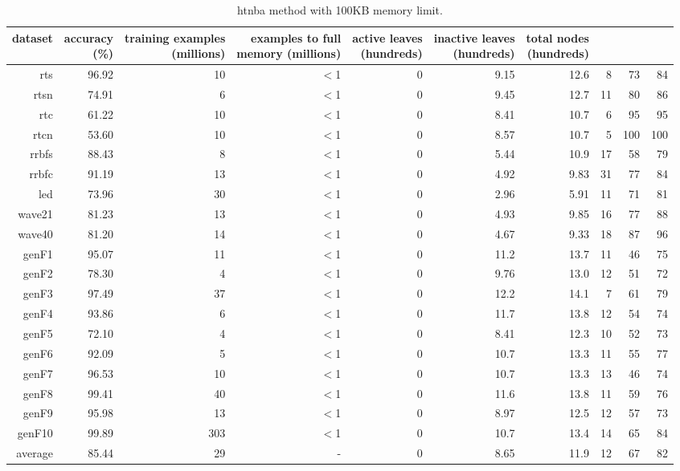 \clearpage
\begin{table}
\caption{{\sc htnba} method with 100KB memory limit.}
\label{tab:htnba-100k}
\centering
\begin{tabular}{|r|r|r|r|r|r|r|r|r|r|}
\hline
dataset	&
\rotatebox{90}{\parbox{9em}{accuracy\\(\%)}} &
\rotatebox{90}{\parbox{9em}{training examples\\(millions)}} &
\rotatebox{90}{\parbox{9em}{examples to full\\memory (millions)}} &
\rotatebox{90}{\parbox{9em}{active leaves\\(hundreds)}} &
\rotatebox{90}{\parbox{9em}{inactive leaves\\(hundreds)}} &
\rotatebox{90}{\parbox{9em}{total nodes\\(hundreds)}} &
\rotatebox{90}{\parbox{9em}{tree depth}}	&
\rotatebox{90}{\parbox{9em}{training speed (\%)}} &
\rotatebox{90}{\parbox{9em}{prediction speed (\%)}} \\
\hline
{\sc rts} & 96.92 & 10 & $<$1 & 0 & 9.15 & 12.6 & 8 & 73 & 84 \\
{\sc rtsn} & 74.91 & 6 & $<$1 & 0 & 9.45 & 12.7 & 11 & 80 & 86 \\
{\sc rtc} & 61.22 & 10 & $<$1 & 0 & 8.41 & 10.7 & 6 & 95 & 95 \\
{\sc rtcn} & 53.60 & 10 & $<$1 & 0 & 8.57 & 10.7 & 5 & 100 & 100 \\
{\sc rrbfs} & 88.43 & 8 & $<$1 & 0 & 5.44 & 10.9 & 17 & 58 & 79 \\
{\sc rrbfc} & 91.19 & 13 & $<$1 & 0 & 4.92 & 9.83 & 31 & 77 & 84 \\
{\sc led} & 73.96 & 30 & $<$1 & 0 & 2.96 & 5.91 & 11 & 71 & 81 \\
{\sc wave21} & 81.23 & 13 & $<$1 & 0 & 4.93 & 9.85 & 16 & 77 & 88 \\
{\sc wave40} & 81.20 & 14 & $<$1 & 0 & 4.67 & 9.33 & 18 & 87 & 96 \\
{\sc genF1} & 95.07 & 11 & $<$1 & 0 & 11.2 & 13.7 & 11 & 46 & 75 \\
{\sc genF2} & 78.30 & 4 & $<$1 & 0 & 9.76 & 13.0 & 12 & 51 & 72 \\
{\sc genF3} & 97.49 & 37 & $<$1 & 0 & 12.2 & 14.1 & 7 & 61 & 79 \\
{\sc genF4} & 93.86 & 6 & $<$1 & 0 & 11.7 & 13.8 & 12 & 54 & 74 \\
{\sc genF5} & 72.10 & 4 & $<$1 & 0 & 8.41 & 12.3 & 10 & 52 & 73 \\
{\sc genF6} & 92.09 & 5 & $<$1 & 0 & 10.7 & 13.3 & 11 & 55 & 77 \\
{\sc genF7} & 96.53 & 10 & $<$1 & 0 & 10.7 & 13.3 & 13 & 46 & 74 \\
{\sc genF8} & 99.41 & 40 & $<$1 & 0 & 11.6 & 13.8 & 11 & 59 & 76 \\
{\sc genF9} & 95.98 & 13 & $<$1 & 0 & 8.97 & 12.5 & 12 & 57 & 73 \\
{\sc genF10} & 99.89 & 303 & $<$1 & 0 & 10.7 & 13.4 & 14 & 65 & 84 \\
\hline
average & 85.44 & 29 &  -  & 0 & 8.65 & 11.9 & 12 & 67 & 82 \\
\hline
\end{tabular}
\end{table}
